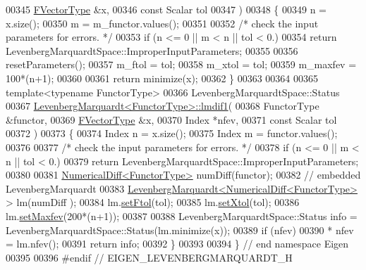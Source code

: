\begin{DoxyCode}
00345         \hyperlink{group___core___module}{FVectorType}  &x,
00346         \textcolor{keyword}{const} Scalar tol
00347         )
00348 \{
00349     n = x.size();
00350     m = m\_functor.values();
00351 
00352     \textcolor{comment}{/* check the input parameters for errors. */}
00353     \textcolor{keywordflow}{if} (n <= 0 || m < n || tol < 0.)
00354         \textcolor{keywordflow}{return} LevenbergMarquardtSpace::ImproperInputParameters;
00355 
00356     resetParameters();
00357     m\_ftol = tol;
00358     m\_xtol = tol;
00359     m\_maxfev = 100*(n+1);
00360 
00361     \textcolor{keywordflow}{return} minimize(x);
00362 \}
00363 
00364 
00365 \textcolor{keyword}{template}<\textcolor{keyword}{typename} FunctorType>
00366 LevenbergMarquardtSpace::Status
00367 \hyperlink{class_eigen_1_1_levenberg_marquardt}{LevenbergMarquardt<FunctorType>::lmdif1}(
00368         FunctorType &functor,
00369         \hyperlink{group___core___module}{FVectorType}  &x,
00370         Index *nfev,
00371         \textcolor{keyword}{const} Scalar tol
00372         )
00373 \{
00374     Index n = x.size();
00375     Index m = functor.values();
00376 
00377     \textcolor{comment}{/* check the input parameters for errors. */}
00378     \textcolor{keywordflow}{if} (n <= 0 || m < n || tol < 0.)
00379         \textcolor{keywordflow}{return} LevenbergMarquardtSpace::ImproperInputParameters;
00380 
00381     \hyperlink{class_eigen_1_1_numerical_diff}{NumericalDiff<FunctorType>} numDiff(functor);
00382     \textcolor{comment}{// embedded LevenbergMarquardt}
00383     \hyperlink{class_eigen_1_1_levenberg_marquardt}{LevenbergMarquardt<NumericalDiff<FunctorType>} > lm(numDiff
      );
00384     lm.\hyperlink{class_eigen_1_1_levenberg_marquardt_a09c0852c6a4534b84a16ac5d9c631c12}{setFtol}(tol);
00385     lm.\hyperlink{class_eigen_1_1_levenberg_marquardt_a691b571366630f1329d2de7a5e40e7a5}{setXtol}(tol);
00386     lm.\hyperlink{class_eigen_1_1_levenberg_marquardt_af072d0f89c44415d8ed284df8b4a634a}{setMaxfev}(200*(n+1));
00387 
00388     LevenbergMarquardtSpace::Status info = LevenbergMarquardtSpace::Status(lm.minimize(x));
00389     \textcolor{keywordflow}{if} (nfev)
00390         * nfev = lm.nfev();
00391     \textcolor{keywordflow}{return} info;
00392 \}
00393 
00394 \} \textcolor{comment}{// end namespace Eigen}
00395 
00396 \textcolor{preprocessor}{#endif // EIGEN\_LEVENBERGMARQUARDT\_H}
\end{DoxyCode}
